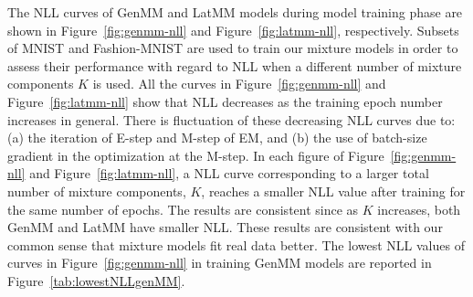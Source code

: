 The NLL curves of GenMM and LatMM models during model training phase are shown in Figure~\ref{fig:genmm-nll} and Figure~\ref{fig:latmm-nll}, respectively. Subsets of MNIST and Fashion-MNIST are used to train our mixture models in order to assess their performance with regard to NLL when a different number of mixture components $K$ is used. All the curves in Figure~\ref{fig:genmm-nll} and Figure~\ref{fig:latmm-nll} show that NLL decreases as the training epoch number increases in general. There is fluctuation of these decreasing NLL curves due to: (a) the iteration of E-step and M-step of EM, and (b) the use of batch-size gradient in the optimization at the M-step. In each figure of Figure~\ref{fig:genmm-nll} and Figure~\ref{fig:latmm-nll}, a NLL curve corresponding to a larger total number of mixture components, $K$, reaches a smaller NLL value after training for the same number of epochs. The results are consistent since as $K$ increases, both GenMM and LatMM have smaller NLL. These results are consistent with our common sense that mixture models fit real data better. The lowest NLL values of curves in Figure~\ref{fig:genmm-nll} in training GenMM models are reported in Figure~\ref{tab:lowestNLLgenMM}.

